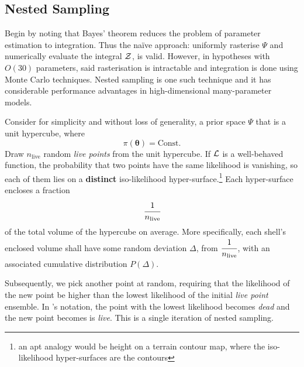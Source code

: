 \documentclass[usenatbib]{mnras}
\begin{document}
\subsection{Nested Sampling}\label{sec:org36366f8}

Begin by noting that Bayes' theorem reduces the problem of
parameter estimation to integration. Thus the naïve approach:
uniformly rasterise \(\Psi\) and numerically evaluate the integral
\({\cal Z}\), is valid. However, in hypotheses with \(O(30)\)
parameters, said rasterisation is intractable \citep{Caflisch_1998}
and integration is done using Monte Carlo techniques. Nested
sampling is one such technique and it has considerable performance
advantages in high-dimensional many-parameter models.

Consider for simplicity and without loss of generality, a prior
space \(\Psi\) that is a unit hypercube, where \[\pi(\bm{\theta})
   = \text{Const.}\] Draw \(n_\text{live}\) random \emph{live points} from
the unit hypercube. If \({\cal L}\) is a well-behaved function, the
probability that two points have the same likelihood is vanishing,
so each of them lies on a \textbf{distinct} iso-likelihood
hyper-surface.\footnote{an apt analogy would be height on a terrain
contour map, where the iso-likelihood hyper-surfaces are the
contours} Each hyper-surface encloses a fraction
\begin{equation}
\cfrac{1}{n_\text{live}}
\end{equation}
of the total volume of the hypercube on average. More specifically,
each shell's enclosed volume shall have some random deviation \(\Delta\), from
\(\cfrac{1}{n_\text{live}}\), with an associated cumulative
distribution \(P(\Delta)\).

Subsequently, we pick another point at random, requiring that the
likelihood of the new point be higher than the lowest likelihood of
the initial \emph{live point} ensemble. In \citeauthor{Skilling2006}'s
notation, the point with the lowest likelihood becomes \emph{dead} and
the new point becomes is \emph{live}. This is a single iteration of
nested sampling.
\end{document}
